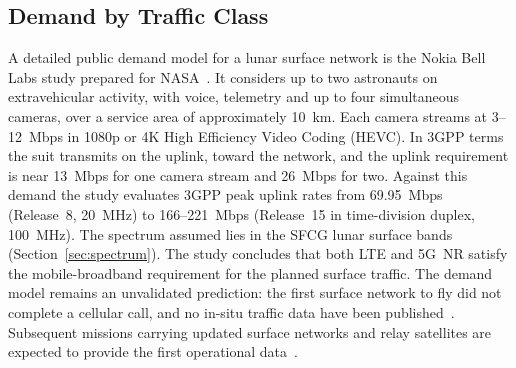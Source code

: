 \documentclass{IEEEoj}
\begin{document}
\subsection{Demand by Traffic Class}
A detailed public demand model for a lunar surface network is the Nokia Bell Labs study prepared for NASA~\cite{nokia_lunar_3gpp}. It considers up to two astronauts on extravehicular activity, with voice, telemetry and up to four simultaneous cameras, over a service area of approximately \SI{10}{km}. Each camera streams at \SI{3}{}--\SI{12}{Mbps} in 1080p or 4K High Efficiency Video Coding (HEVC). In 3GPP terms the suit transmits on the uplink, toward the network, and the uplink requirement is near \SI{13}{Mbps} for one camera stream and \SI{26}{Mbps} for two. Against this demand the study evaluates 3GPP peak uplink rates from \SI{69.95}{Mbps} (Release~8, \SI{20}{MHz}) to \SI{166}{}--\SI{221}{Mbps} (Release~15 in time-division duplex, \SI{100}{MHz}). The spectrum assumed lies in the SFCG lunar surface bands (Section~\ref{sec:spectrum}). The study concludes that both LTE and 5G~NR satisfy the mobile-broadband requirement for the planned surface traffic. The demand model remains an unvalidated prediction: the first surface network to fly did not complete a cellular call, and no in-situ traffic data have been published~\cite{nokia_lunar_3gpp}. Subsequent missions carrying updated surface networks and relay satellites are expected to provide the first operational data~\cite{im_ldn_constellation}.
\end{document}
